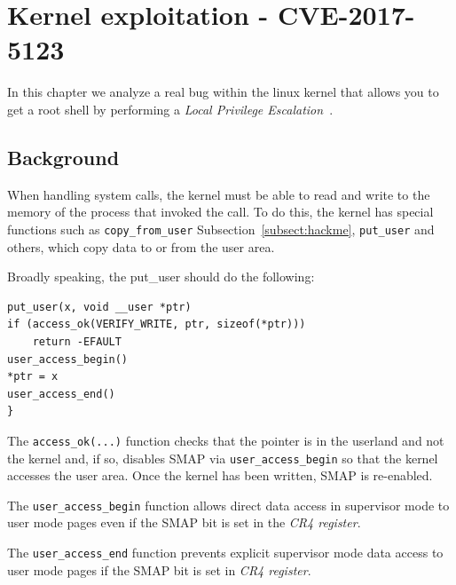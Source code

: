 \documentclass{masterthesis}
\newcommand{\vtnote}[1]{\todo[color=green!20]{#1}}
\newcommand{\refToSubSection}[1]{Subsection~\ref{subsect:#1}\xspace}
\begin{document}
\chapter{Kernel exploitation - CVE-2017-5123}
\label{ch:cve-2017}
\vtnote{da verificare da qui in giù}
In this chapter we analyze a real bug within the linux kernel that allows you to get a root shell by performing a \emph{Local Privilege Escalation}~\cite{farah2017study}.
\section{Background}
\label{sect:back-cve-2017}
When handling system calls, the kernel must be able to read and write to the memory of the process that invoked the call. To do this, the kernel has special functions such as \lstinline{copy_from_user} \refToSubSection{hackme}, \lstinline{put_user} and others, which copy data to or from the user area.

Broadly speaking, the put_user should do the following:
\begin{lstlisting}
put_user(x, void __user *ptr)
if (access_ok(VERIFY_WRITE, ptr, sizeof(*ptr)))
    return -EFAULT
user_access_begin()
*ptr = x
user_access_end()
}
\end{lstlisting}
The \lstinline{access_ok(...)} function checks that the pointer is in the userland and not the kernel and, if so, disables SMAP via \lstinline{user_access_begin} so that the kernel accesses the user area. Once the kernel has been written, SMAP is re-enabled.

The \texttt{user_access_begin} function allows direct data access in supervisor mode to user mode pages even if the SMAP bit is set in the \emph{CR4 register}.

The \texttt{user_access_end} function prevents explicit supervisor mode data access to user mode pages if the SMAP bit is set in \emph{CR4 register}.
\end{document}
